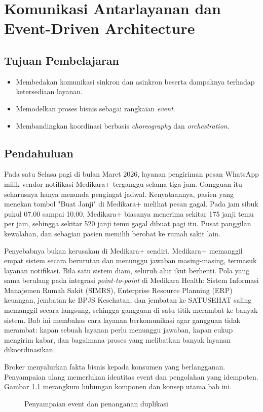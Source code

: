\chapter{Komunikasi Antarlayanan dan Event-Driven Architecture}
\label{ch:ch09}

\section*{Tujuan Pembelajaran}
\begin{itemize}
  \item Membedakan komunikasi sinkron dan asinkron beserta dampaknya terhadap ketersediaan layanan.
  \item Memodelkan proses bisnis sebagai rangkaian \textit{event}.
  \item Membandingkan koordinasi berbasis \textit{choreography} dan \textit{orchestration}.
\end{itemize}

\section{Pendahuluan}

Pada satu Selasa pagi di bulan Maret 2026, layanan pengiriman pesan WhatsApp milik vendor notifikasi
Medikara+ terganggu selama tiga jam. Gangguan itu seharusnya hanya menunda pengingat jadwal.
Kenyataannya, pasien yang menekan tombol "Buat Janji" di Medikara+ melihat pesan gagal. Pada jam
sibuk pukul 07.00 sampai 10.00, Medikara+ biasanya menerima sekitar 175 janji temu per jam, sehingga
sekitar 520 janji temu gagal dibuat pagi itu. Pusat panggilan kewalahan, dan sebagian pasien
memilih berobat ke rumah sakit lain.

Penyebabnya bukan kerusakan di Medikara+ sendiri. Medikara+ memanggil empat sistem secara berurutan
dan menunggu jawaban masing-masing, termasuk layanan notifikasi. Bila satu sistem diam, seluruh alur
ikut berhenti. Pola yang sama berulang pada integrasi \textit{point-to-point} di Medikara Health:
Sistem Informasi Manajemen Rumah Sakit (SIMRS), Enterprise Resource Planning (ERP) keuangan,
jembatan ke BPJS Kesehatan, dan jembatan ke SATUSEHAT saling memanggil secara langsung, sehingga
gangguan di satu titik merambat ke banyak sistem. Bab ini membahas cara layanan berkomunikasi agar
gangguan tidak merambat: kapan sebuah layanan perlu menunggu jawaban, kapan cukup mengirim kabar,
dan bagaimana proses yang melibatkan banyak layanan dikoordinasikan.

Broker menyalurkan fakta bisnis kepada konsumen yang berlangganan.
Penyampaian ulang memerlukan identitas event dan pengolahan yang idempoten.
Gambar \ref{fig:ch09-pos-pemilah} merangkum hubungan komponen dan konsep utama bab ini.
\begin{figure}[!htb]
  \centering
  
  \caption{Penyampaian event dan penanganan duplikasi}
  \label{fig:ch09-pos-pemilah}
\end{figure}

